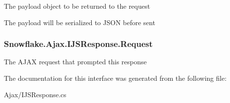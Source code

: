 The payload object to be returned to the request 

The payload will be serialized to J\+S\+O\+N before sent\hypertarget{interface_snowflake_1_1_ajax_1_1_i_j_s_response_ae35c86f83855bf0a8dcf50257b802b1e}{}
\subsubsection[{Request}]{ Snowflake.\+Ajax.\+I\+J\+S\+Response.\+Request\hspace{0.3cm}{\ttfamily [get]}}\label{interface_snowflake_1_1_ajax_1_1_i_j_s_response_ae35c86f83855bf0a8dcf50257b802b1e}


The A\+J\+A\+X request that prompted this response 



The documentation for this interface was generated from the following file\+:\begin{DoxyCompactItemize}
\item 
Ajax/I\+J\+S\+Response.\+cs\end{DoxyCompactItemize}
